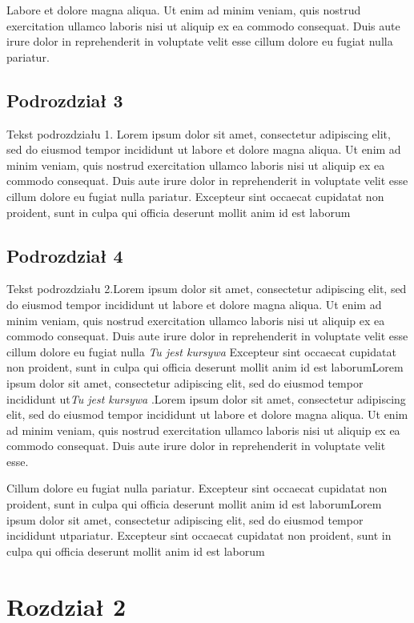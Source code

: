 \documentclass[12pt,a4paper,titlepage]{article}
\begin{document}
Labore et dolore magna aliqua. Ut enim ad minim veniam, quis nostrud exercitation ullamco laboris nisi ut aliquip ex ea commodo consequat. Duis aute irure dolor in reprehenderit in voluptate velit esse cillum dolore eu fugiat nulla pariatur. 

\subsection{Podrozdział 3}

Tekst podrozdziału 1. Lorem ipsum dolor sit amet, consectetur adipiscing elit, sed do eiusmod tempor incididunt ut labore et dolore magna aliqua. Ut enim ad minim veniam, quis nostrud exercitation ullamco laboris nisi ut aliquip ex ea commodo consequat. Duis aute irure dolor in reprehenderit in voluptate velit esse cillum dolore eu fugiat nulla pariatur. Excepteur sint occaecat cupidatat non proident, sunt in culpa qui officia deserunt mollit anim id est laborum

\subsection{Podrozdział 4}

Tekst podrozdziału 2.Lorem ipsum dolor sit amet, consectetur adipiscing elit, sed do eiusmod tempor incididunt ut labore et dolore magna aliqua. Ut enim ad minim veniam, quis nostrud exercitation ullamco laboris nisi ut aliquip ex ea commodo consequat. Duis aute irure dolor in reprehenderit in voluptate velit esse cillum dolore eu fugiat nulla \textit{Tu jest kursywa}  Excepteur sint occaecat cupidatat non proident, sunt in culpa qui officia deserunt mollit anim id est laborumLorem ipsum dolor sit amet, consectetur adipiscing elit, sed do eiusmod tempor incididunt ut\textit{Tu jest kursywa} .Lorem ipsum dolor sit amet, consectetur adipiscing elit, sed do eiusmod tempor incididunt ut labore et dolore magna aliqua. Ut enim ad minim veniam, quis nostrud exercitation ullamco laboris nisi ut aliquip ex ea commodo consequat. Duis aute irure dolor in reprehenderit in voluptate velit esse. \par Cillum dolore eu fugiat nulla pariatur. Excepteur sint occaecat cupidatat non proident, sunt in culpa qui officia deserunt mollit anim id est laborumLorem ipsum dolor sit amet, consectetur adipiscing elit, sed do eiusmod tempor incididunt utpariatur. Excepteur sint occaecat cupidatat non proident, sunt in culpa qui officia deserunt mollit anim id est laborum


\section{Rozdział 2}
\end{document}
